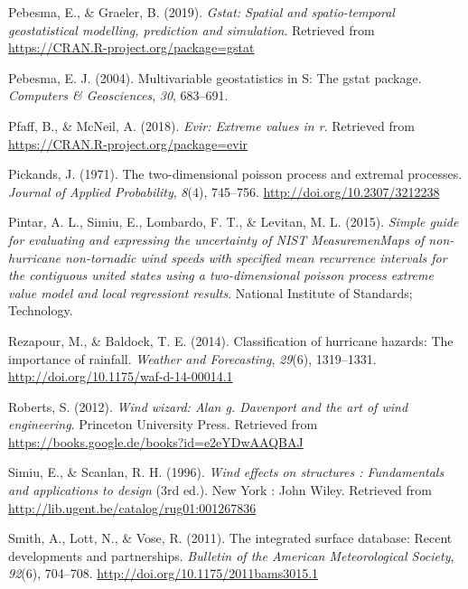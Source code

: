 \documentclass[12pt,oneside]{reedthesis}
\begin{document}
\leavevmode\hypertarget{ref-Pebesma2019}{}%
Pebesma, E., \& Graeler, B. (2019). \emph{Gstat: Spatial and spatio-temporal geostatistical modelling, prediction and simulation}. Retrieved from \url{https://CRAN.R-project.org/package=gstat}

\leavevmode\hypertarget{ref-Pebesma2004}{}%
Pebesma, E. J. (2004). Multivariable geostatistics in S: The gstat package. \emph{Computers \& Geosciences}, \emph{30}, 683--691.

\leavevmode\hypertarget{ref-Pfaff2018}{}%
Pfaff, B., \& McNeil, A. (2018). \emph{Evir: Extreme values in r}. Retrieved from \url{https://CRAN.R-project.org/package=evir}

\leavevmode\hypertarget{ref-Pickands1971}{}%
Pickands, J. (1971). The two-dimensional poisson process and extremal processes. \emph{Journal of Applied Probability}, \emph{8}(4), 745--756. \url{http://doi.org/10.2307/3212238}

\leavevmode\hypertarget{ref-Pintar2015}{}%
Pintar, A. L., Simiu, E., Lombardo, F. T., \& Levitan, M. L. (2015). \emph{Simple guide for evaluating and expressing the uncertainty of NIST MeasuremenMaps of non-hurricane non-tornadic wind speeds with specified mean recurrence intervals for the contiguous united states using a two-dimensional poisson process extreme value model and local regressiont results}. National Institute of Standards; Technology.

\leavevmode\hypertarget{ref-Rezapour2014}{}%
Rezapour, M., \& Baldock, T. E. (2014). Classification of hurricane hazards: The importance of rainfall. \emph{Weather and Forecasting}, \emph{29}(6), 1319--1331. \url{http://doi.org/10.1175/waf-d-14-00014.1}

\leavevmode\hypertarget{ref-Roberts2012}{}%
Roberts, S. (2012). \emph{Wind wizard: Alan g. Davenport and the art of wind engineering}. Princeton University Press. Retrieved from \url{https://books.google.de/books?id=e2eYDwAAQBAJ}

\leavevmode\hypertarget{ref-Simiu1996}{}%
Simiu, E., \& Scanlan, R. H. (1996). \emph{Wind effects on structures : Fundamentals and applications to design} (3rd ed.). New York : John Wiley. Retrieved from \url{http://lib.ugent.be/catalog/rug01:001267836}

\leavevmode\hypertarget{ref-Smith2011}{}%
Smith, A., Lott, N., \& Vose, R. (2011). The integrated surface database: Recent developments and partnerships. \emph{Bulletin of the American Meteorological Society}, \emph{92}(6), 704--708. \url{http://doi.org/10.1175/2011bams3015.1}
\end{document}
